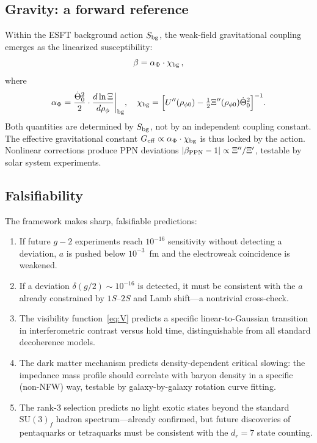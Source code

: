 ﻿\documentclass[a4paper,12pt]{article}
\begin{document}
\subsection{Gravity: a forward reference}

Within the ESFT background action $S_{\rm bg}$, the weak-field
gravitational coupling emerges as the linearized susceptibility:
\begin{equation}
  \beta = \alpha_\Phi\cdot\chi_{\rm bg}\,,
  \label{eq:beta}
\end{equation}
where
\begin{equation}
  \alpha_\Phi = \frac{\dot\Theta_0^2}{2}\cdot
    \frac{d\ln\Xi}{d\rho_\phi}\bigg|_{\rm bg},\quad
  \chi_{\rm bg} = \Big[U''(\rho_{\phi 0})
    - \tfrac{1}{2}\Xi''(\rho_{\phi 0})\dot\Theta_0^2\Big]^{-1}.
\end{equation}
Both quantities are determined by $S_{\rm bg}$, not by an independent
coupling constant.  The effective gravitational constant
$G_{\rm eff}\propto\alpha_\Phi\cdot\chi_{\rm bg}$ is thus locked by
the action.  Nonlinear corrections produce PPN deviations
$|\beta_{\rm PPN}-1|\propto\Xi''/\Xi'$, testable by solar system
experiments.

\subsection{Falsifiability}

The framework makes sharp, falsifiable predictions:
\begin{enumerate}
  \item If future $g{-}2$ experiments reach $10^{-16}$
    sensitivity without detecting a deviation, $a$ is pushed below
    $10^{-3}$~fm and the electroweak coincidence is weakened.
  \item If a deviation $\delta(g/2)\sim 10^{-16}$ is detected, it
    must be consistent with the $a$ already constrained by $1S$--$2S$
    and Lamb shift---a nontrivial cross-check.
  \item The visibility function~\eqref{eq:V} predicts a specific
    linear-to-Gaussian transition in interferometric contrast versus
    hold time, distinguishable from all standard decoherence models.
  \item The dark matter mechanism predicts density-dependent critical
    slowing: the impedance mass profile should correlate with baryon
    density in a specific (non-NFW) way, testable by galaxy-by-galaxy
    rotation curve fitting.
  \item The rank-3 selection predicts no light exotic states beyond the
    standard $\mathrm{SU}(3)_f$ hadron spectrum---already confirmed,
    but future discoveries of pentaquarks or tetraquarks must be
    consistent with the $d_r=7$ state counting.
\end{enumerate}
\end{document}
